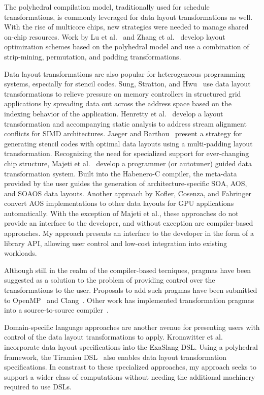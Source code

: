 \documentclass{article}
\begin{document}
The polyhedral compilation model, traditionally used for schedule transformations, is commonly leveraged for data layout transformations as well.
With the rise of multicore chips, new strategies were needed to manage shared on-chip resources. 
Work by Lu et al.~\cite{lu2009data} and Zhang et al.~\cite{zhang2011optimizing} develop layout optimization schemes based on the polyhedral model and use a combination of strip-mining, permutation, and padding transformations.


Data layout transformations are also popular for heterogeneous programming systems, especially for stencil codes.
Sung, Stratton, and Hwu~\cite{sung2010data} use data layout transformations to relieve pressure on memory controllers in structured grid applications by spreading data out across the address space based on the indexing behavior of the application.
Henretty et al.~\cite{henretty2011data} develop a layout transformation and accompanying static analysis to address stream alignment conflicts for SIMD architectures.
Jaeger and Barthou~\cite{jaeger2012automatic} present a strategy for generating stencil codes with optimal data layouts using a multi-padding layout transformation.
Recognizing the need for specialized support for ever-changing chip structure, Majeti et al.~\cite{majeti2013compiler} develop a programmer (or autotuner) guided data transformation system.
Built into the Habenero-C compiler, the meta-data provided by the user guides the generation of architecture-specific SOA, AOS, and SOAOS data layouts.
Another approach by Kofler, Cosenza, and Fahringer~\cite{kofler2015automatic} convert AOS implementations to other data layouts for GPU applications automatically.  
With the exception of Majeti et al., these approaches do not provide an interface to the developer, and without exception are compiler-based approaches.
My approach presents an interface to the developer in the form of a library API, allowing user control and low-cost integration into existing workloads.

Although still in the realm of the compiler-based tecniques, pragmas have been suggested as a solution to the problem of providing control over the transformations to the user.
Proposals to add such pragmas have been submitted to OpenMP~\cite{kruse2019design} and Clang~\cite{kruse2018user}.
Other work has implemented transformation pragmas into a source-to-source compiler~\cite{xu2014semi}. 


Domain-specific language approaches are another avenue for presenting users with control of the data layout transformations to apply. 
Kronawitter et al.~\cite{kronawitter2018automatic} incorporate data layout specifications into the ExaSlang DSL.
Using a polyhedral framework, the Tiramisu DSL~\cite{baghdadi2019tiramisu} also enables data layout transformation specifications.
In constrast to these specialized approaches, my approach seeks to support a wider class of computations without needing the additional machinery required to use DSLs. 
\end{document}
